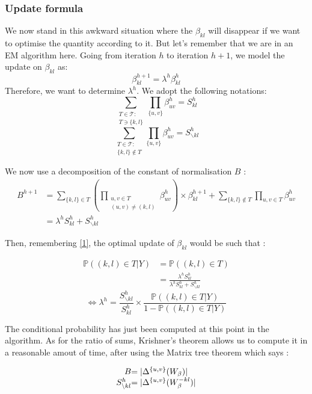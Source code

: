 \documentclass[a4paper,10pt]{article}
\begin{document}
\subsubsection{Update formula}
 We now stand in this awkward situation where the $\beta_{kl}$ will disappear if we want to optimise the quantity according to it. But let's 
 remember that we are in an EM algorithm here. Going from iteration $h$ to iteration $h+1$, we model the update on $\beta_{kl}$ as:
 \[\beta_{kl}^{h+1} = \lambda^h \beta_{kl}^h\]
Therefore, we want to determine $\lambda^h$. We adopt the following notations:
\[ \sum_{\substack{T\in \mathcal{T}:\\T \ni \{k,l\}}} \prod_{\{u,v\}} \beta_{uv}^h= S_{kl}^h\]
\[ \sum_{\substack{T\in \mathcal{T}:\\\{k,l\} \notin T }} \prod_{\{u,v\}} \beta_{uv}^h= S_{\backslash kl}^h\]

We now use a decomposition of the constant of normalisation $B$ :
\begin{align*}
B^{h+1}  &=\sum_{\{k,l\} \in T } \left(\prod_{\substack{u,v\in T\\ (u,v) \neq (k,l)}} \beta_{uv}^{h}\right) \times\beta_{kl}^{h+1} +\sum_{\{k,l\} \notin T }
 \prod_{u,v\in T} \beta_{uv}^{h}\\
 &=\lambda^h S_{kl}^h + S_{\backslash kl}^{h}
\end{align*}

Then, remembering \ref{1}, the optimal update of $\beta_{kl}$ would be such that :

\begin{align*}
 \mathds{P}((k,l)\in T | Y)&=\mathds{P}((k,l)\in T)\\
 &=\frac{\lambda^h S_{kl}^h}{\lambda^h S_{kl}^h+S_{\backslash kl}^{h}}
\end{align*}
\[\Leftrightarrow \lambda^h = \frac{S_{\backslash kl}^{h}}{S_{kl}^h}\times\frac{\mathds{P}((k,l)\in T | Y) }{1-\mathds{P}((k,l)\in T | Y)}\]

The conditional probability has just been computed at this point in the algorithm. As for the ratio of sums, Krishner's theorem allows us
to compute it in a reasonable amout of time, after using the Matrix tree theorem which says :


\begin{align*}
  \begin{array}{r@{}l}
    B & =|\Delta^{\{u,v\}}(W_{\beta})| \\
    S_{\backslash kl}^{h}& =|\Delta^{\{u,v\}}(W_{\beta}^{- kl})|
  \end{array}
 \end{align*}
 
\end{document}
